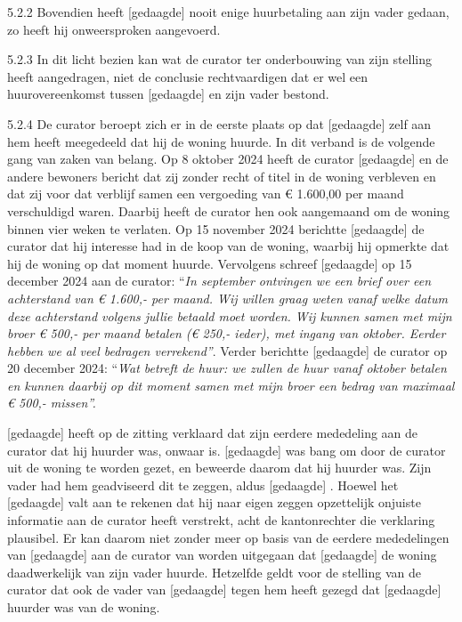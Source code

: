 \documentclass[
  dutch,
  a4paper,
]{article}
\begin{document}
5.2.2 Bovendien heeft {[}gedaagde{]} nooit enige huurbetaling aan zijn vader gedaan, zo heeft hij onweersproken aangevoerd.

5.2.3 In dit licht bezien kan wat de curator ter onderbouwing van zijn stelling heeft aangedragen, niet de conclusie rechtvaardigen dat er wel een huurovereenkomst tussen {[}gedaagde{]} en zijn vader bestond.

5.2.4 De curator beroept zich er in de eerste plaats op dat {[}gedaagde{]} zelf aan hem heeft meegedeeld dat hij de woning huurde. In dit verband is de volgende gang van zaken van belang. Op 8 oktober 2024 heeft de curator {[}gedaagde{]} en de andere bewoners bericht dat zij zonder recht of titel in de woning verbleven en dat zij voor dat verblijf samen een vergoeding van € 1.600,00 per maand verschuldigd waren. Daarbij heeft de curator hen ook aangemaand om de woning binnen vier weken te verlaten. Op 15 november 2024 berichtte {[}gedaagde{]} de curator dat hij interesse had in de koop van de woning, waarbij hij opmerkte dat hij de woning op dat moment huurde. Vervolgens schreef {[}gedaagde{]} op 15 december 2024 aan de curator: ``\emph{In september ontvingen we een brief over een achterstand van € 1.600,- per maand. Wij willen graag weten vanaf welke datum deze achterstand volgens jullie betaald moet worden. Wij kunnen samen met mijn broer € 500,- per maand betalen (€ 250,- ieder), met ingang van oktober. Eerder hebben we al veel bedragen verrekend''}. Verder berichtte {[}gedaagde{]} de curator op 20 december 2024: ``\emph{Wat betreft de huur: we zullen de huur vanaf oktober betalen en kunnen daarbij op dit moment samen met mijn broer een bedrag van maximaal € 500,- missen''.}

{[}gedaagde{]} heeft op de zitting verklaard dat zijn eerdere mededeling aan de curator dat hij huurder was, onwaar is. {[}gedaagde{]} was bang om door de curator uit de woning te worden gezet, en beweerde daarom dat hij huurder was. Zijn vader had hem geadviseerd dit te zeggen, aldus {[}gedaagde{]} . Hoewel het {[}gedaagde{]} valt aan te rekenen dat hij naar eigen zeggen opzettelijk onjuiste informatie aan de curator heeft verstrekt, acht de kantonrechter die verklaring plausibel. Er kan daarom niet zonder meer op basis van de eerdere mededelingen van {[}gedaagde{]} aan de curator van worden uitgegaan dat {[}gedaagde{]} de woning daadwerkelijk van zijn vader huurde. Hetzelfde geldt voor de stelling van de curator dat ook de vader van {[}gedaagde{]} tegen hem heeft gezegd dat {[}gedaagde{]} huurder was van de woning.
\end{document}
